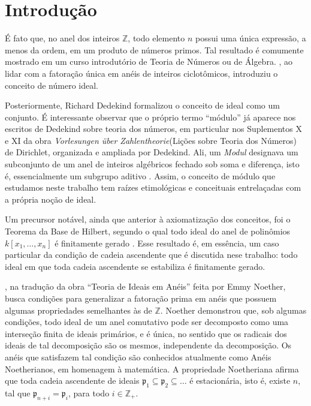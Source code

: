 
\newcommand{\recuo}{\hspace*{1.25cm}}

\section*{Introdução}

\recuo É fato que, no anel dos inteiros $\mathbb{Z}$, todo elemento $n$ possui uma única expressão, a menos da ordem, em um produto de números primos. Tal resultado é comumente mostrado em um curso introdutório de Teoria de Números ou de Álgebra. \textcite{kummer1847}, ao lidar com a fatoração única em anéis de inteiros ciclotômicos, introduziu o conceito de número ideal.

Posteriormente, Richard Dedekind formalizou o conceito de ideal como um conjunto. É interessante observar que o próprio termo ``módulo'' já aparece nos escritos de Dedekind sobre teoria dos números, em particular nos Suplementos X e XI da obra \emph{Vorlesungen über Zahlentheorie}(Lições sobre Teoria dos Números) de Dirichlet, organizada e ampliada por Dedekind. Ali, um \emph{Modul} designava um subconjunto de um anel de inteiros algébricos fechado sob soma e diferença, isto é, essencialmente um subgrupo aditivo \parencite{dedekind1871}. Assim, o conceito de módulo que estudamos neste trabalho tem raízes etimológicas e conceituais entrelaçadas com a própria noção de ideal.

Um precursor notável, ainda que anterior à axiomatização dos conceitos, foi o Teorema da Base de Hilbert, segundo o qual todo ideal do anel de polinômios $k[x_1,\dots,x_n]$ é finitamente gerado \parencite{hilbert1890}. Esse resultado é, em essência, um caso particular da condição de cadeia ascendente que é discutida nese trabalho: todo ideal em que toda cadeia ascendente se estabiliza é finitamente gerado.

\textcite{noether}, na tradução da obra ``Teoria de Ideais em Anéis'' feita por Emmy Noether, busca condições para generalizar a fatoração prima em anéis que possuem algumas propriedades semelhantes às de $\mathbb{Z}$. Noether demonstrou que, sob algumas condições, todo ideal de um anel comutativo pode ser decomposto como uma interseção finita de ideais primários, e é única, no sentido que os radicais dos ideais de tal decomposição são os mesmos, independente da decomposição. Os anéis que satisfazem tal condição são conhecidos atualmente como Anéis Noetherianos, em homenagem à matemática.
A propriedade Noetheriana afirma que toda cadeia ascendente de ideais $\mathfrak{p}_{1} \subseteq \mathfrak{p}_{2} \subseteq\dots$ é estacionária, isto é, existe $n$, tal que $\mathfrak{p}_{n+i}=\mathfrak{p}_{i}$, para todo $i \in \mathbb{Z}_{+}$.


